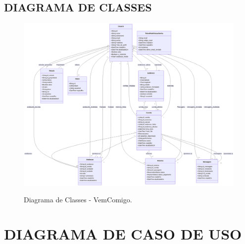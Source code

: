 \begin{anexosenv}
\begin{landscape}
\end{landscape}

\begin{landscape}
	
	\chapter{DIAGRAMA DE CLASSES}
	
	\begin{figure}[htb!]
		\centering
		\caption{Diagrama de Classes - VemComigo.}
		\includegraphics[width=1.25\textwidth]{img/diagrama_classes.png}
		\label{fig:diagrama_classes}

	\end{figure}
	
\end{landscape}

	
\chapter{DIAGRAMA DE CASO DE USO}


\end{anexosenv}
